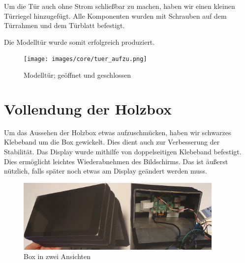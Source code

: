 Um die Tür auch ohne Strom schließbar zu machen, haben wir einen kleinen Türriegel hinzugefügt. Alle Komponenten wurden mit
Schrauben auf dem Türrahmen und dem Türblatt befestigt.

Die Modelltür wurde somit erfolgreich produziert.
\begin{figure}[H]
    \begin{center}
        \texttt{[image: images/core/tuer\_aufzu.png]}
        \caption{Modelltür; geöffnet und geschlossen}
    \end{center}
\end{figure}

\section{Vollendung der Holzbox}
Um das Aussehen der Holzbox etwas aufzuschmücken, haben wir schwarzes Klebeband um die Box gewickelt. Dies dient auch zur Verbesserung der
Stabilität. Das Display wurde mithilfe von doppelseitigen Klebeband befestigt. Dies ermöglicht leichtes Wiederabnehmen des Bildschirms.
Das ist äußerst nützlich, falls später noch etwas am Display geändert werden muss.


\begin{figure}[H]
    \begin{center}
        \includegraphics[width=0.9\textwidth]{images/core/box_45innen.jpg}
        \caption{Box in zwei Ansichten}
    \end{center}
\end{figure}